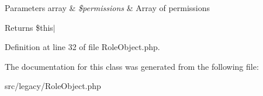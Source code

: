 \begin{DoxyParams}[1]{\-Parameters}
array & {\em \$permissions} & \-Array of permissions\\
\hline
\end{DoxyParams}
\begin{DoxyReturn}{\-Returns}
\$this$|$ 
\end{DoxyReturn}


\-Definition at line 32 of file \-Role\-Object.\-php.




\-The documentation for this class was generated from the following file\-:\begin{DoxyCompactItemize}
\item 
src/legacy/\-Role\-Object.\-php\end{DoxyCompactItemize}
